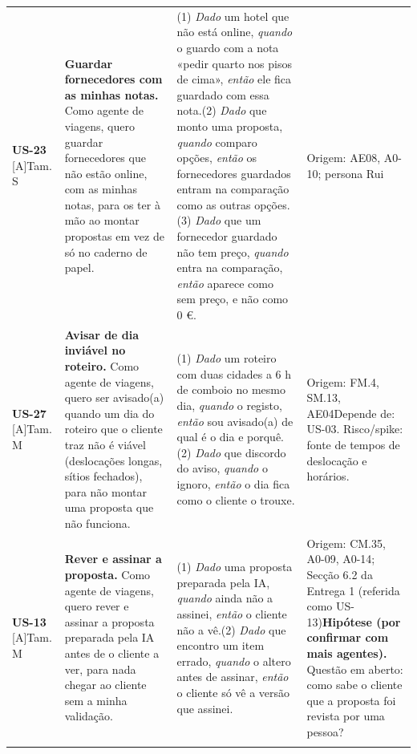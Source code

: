 {\begin{longtable}{@{}p{1.5cm}p{5.1cm}p{5.2cm}p{3.6cm}@{}}
\textbf{US-23} [A]\newline Tam. S & \textbf{Guardar fornecedores com as minhas notas.} Como agente de viagens, quero guardar fornecedores que não estão online, com as minhas notas, para os ter à mão ao montar propostas em vez de só no caderno de papel. & (1) \textit{Dado} um hotel que não está online, \textit{quando} o guardo com a nota «pedir quarto nos pisos de cima», \textit{então} ele fica guardado com essa nota.\newline (2) \textit{Dado} que monto uma proposta, \textit{quando} comparo opções, \textit{então} os fornecedores guardados entram na comparação como as outras opções.\newline (3) \textit{Dado} que um fornecedor guardado não tem preço, \textit{quando} entra na comparação, \textit{então} aparece como sem preço, e não como 0 €. & Origem: AE08, A0-10; persona Rui \\ \addlinespace
\textbf{US-27} [A]\newline Tam. M & \textbf{Avisar de dia inviável no roteiro.} Como agente de viagens, quero ser avisado(a) quando um dia do roteiro que o cliente traz não é viável (deslocações longas, sítios fechados), para não montar uma proposta que não funciona. & (1) \textit{Dado} um roteiro com duas cidades a 6 h de comboio no mesmo dia, \textit{quando} o registo, \textit{então} sou avisado(a) de qual é o dia e porquê.\newline (2) \textit{Dado} que discordo do aviso, \textit{quando} o ignoro, \textit{então} o dia fica como o cliente o trouxe. & Origem: FM.4, SM.13, AE04\newline Depende de: US-03. Risco/spike: fonte de tempos de deslocação e horários. \\ \addlinespace
\textbf{US-13} [A]\newline Tam. M & \textbf{Rever e assinar a proposta.} Como agente de viagens, quero rever e assinar a proposta preparada pela IA antes de o cliente a ver, para nada chegar ao cliente sem a minha validação. & (1) \textit{Dado} uma proposta preparada pela IA, \textit{quando} ainda não a assinei, \textit{então} o cliente não a vê.\newline (2) \textit{Dado} que encontro um item errado, \textit{quando} o altero antes de assinar, \textit{então} o cliente só vê a versão que assinei. & Origem: CM.35, A0-09, A0-14; Secção 6.2 da Entrega 1 (referida como US-13)\newline \textbf{Hipótese (por confirmar com mais agentes).} Questão em aberto: como sabe o cliente que a proposta foi revista por uma pessoa? \\ \addlinespace

\end{longtable}}
